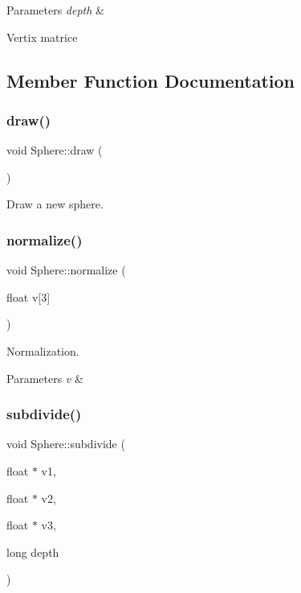 \begin{DoxyParams}{Parameters}
{\em depth} & \\
\hline
\end{DoxyParams}
Vertix matrice 

\subsection{Member Function Documentation}
\mbox{\label{classSphere_a34a34167b7544c95155d3ff30638d045}} 
\subsubsection{\texorpdfstring{draw()}{draw()}}
{\footnotesize\ttfamily void Sphere\+::draw (\begin{DoxyParamCaption}{ }\end{DoxyParamCaption})\hspace{0.3cm}{\ttfamily [protected]}}



Draw a new sphere. 

\mbox{\label{classSphere_a8b5387063d440b1e08d1b2f8ed4358f2}} 
\subsubsection{\texorpdfstring{normalize()}{normalize()}}
{\footnotesize\ttfamily void Sphere\+::normalize (\begin{DoxyParamCaption}\item[{float}]{v\mbox{[}3\mbox{]} }\end{DoxyParamCaption})\hspace{0.3cm}{\ttfamily [protected]}}



Normalization. 


\begin{DoxyParams}{Parameters}
{\em v} & \\
\hline
\end{DoxyParams}
\mbox{\label{classSphere_a8ecd1525d70024bb3580215c18d0eae9}} 
\subsubsection{\texorpdfstring{subdivide()}{subdivide()}}
{\footnotesize\ttfamily void Sphere\+::subdivide (\begin{DoxyParamCaption}\item[{float $\ast$}]{v1,  }\item[{float $\ast$}]{v2,  }\item[{float $\ast$}]{v3,  }\item[{long}]{depth }\end{DoxyParamCaption})\hspace{0.3cm}{\ttfamily [protected]}}



